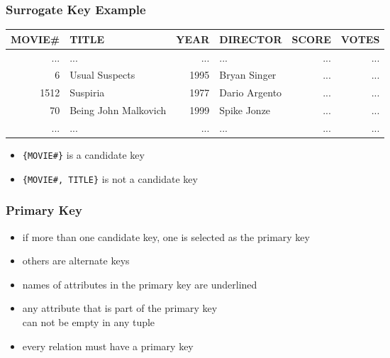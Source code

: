 \documentclass[dvipsnames]{beamer}
\theoremstyle{plain}
\begin{document}
\begin{frame}
  \frametitle{Surrogate Key Example}

    \begin{footnotesize}
    \begin{table}
      \begin{tabular}{|r|l|r|l|r|r|}\hline
MOVIE\# & TITLE                & YEAR & DIRECTOR      & SCORE & VOTES\\\hline\hline
    ... & ...                  &  ... & ...           &   ... &   ...\\\hline
      6 & Usual Suspects       & 1995 & Bryan Singer  &   ... &   ...\\\hline
   1512 & Suspiria             & 1977 & Dario Argento &   ... &   ...\\\hline
     70 & Being John Malkovich & 1999 & Spike Jonze   &   ... &   ...\\\hline
    ... & ...                  &  ... & ...           &   ... &   ...\\\hline
      \end{tabular}
    \end{table}
    \end{footnotesize}

    \begin{itemize}
      \item \texttt{\{MOVIE\#\}} is a candidate key
      \item \texttt{\{MOVIE\#, TITLE\}} is not a candidate key
    \end{itemize}
\end{frame}

\begin{frame}
  \frametitle{Primary Key}

  \begin{itemize}
    \item if more than one candidate key,
      one is selected as the \alert{primary key}
    \item others are alternate keys
    \item names of attributes in the primary key are underlined

    \pause
    \medskip
    \item any attribute that is part of the primary key\\
      can not be empty in any tuple

    \medskip
    \item every relation must have a primary key
  \end{itemize}
\end{frame}
\end{document}
